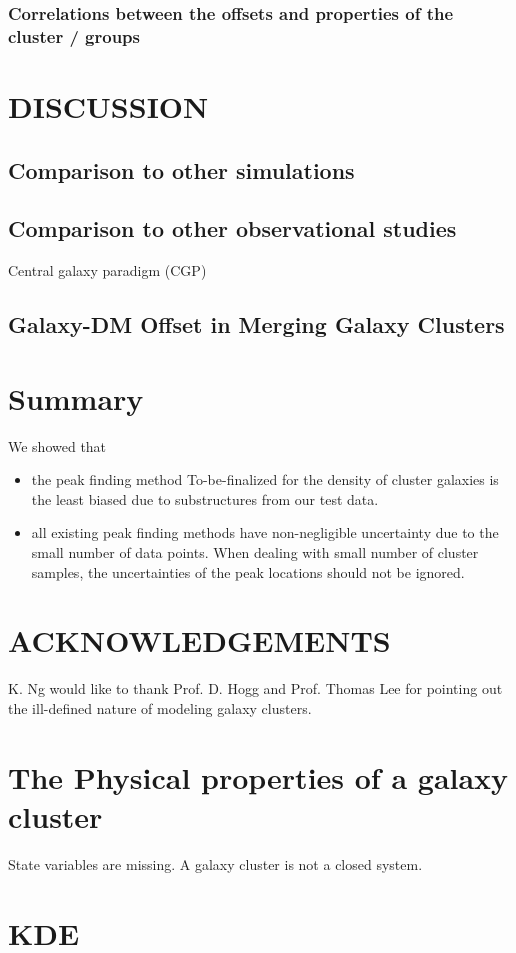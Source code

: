 \documentclass[usenatbib]{mn2e}
\begin{document}
\subsubsection{Correlations between the offsets and properties of the cluster / groups}
\section{DISCUSSION}
\subsection{Comparison to other simulations}
\subsection{Comparison to other observational studies}
Central galaxy paradigm (CGP)


\subsection{Galaxy-DM Offset in Merging Galaxy Clusters}



\section{Summary}
We showed that 
\begin{itemize}
		\item  the peak finding method To-be-finalized for the density of cluster
			galaxies is the least biased due to substructures from our test data. 
		\item  all existing peak finding methods have non-negligible uncertainty 
			due to the small number of data points. When dealing with small number of
			cluster samples, the uncertainties of the peak locations should not be
			ignored.
\end{itemize}




\section{ACKNOWLEDGEMENTS}
K. Ng would like to thank Prof. D. Hogg and Prof. Thomas Lee for pointing out the ill-defined nature of
modeling galaxy clusters.

\appendix 
\section{The Physical properties of a galaxy cluster}
State variables are missing.
A galaxy cluster is not a closed system. 





% 
\appendix
\section{KDE}
\clearpage\bsp\label{lastpage} 
\end{document}
